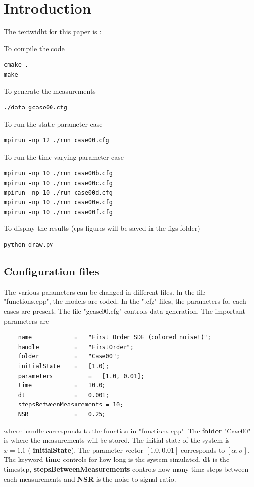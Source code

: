 \documentclass[]{elsarticle}
\begin{document}
\linenumbers

\section*{Introduction}
The textwidht for this paper is : \the\textwidth


To compile the code
\begin{verbatim}
cmake .
make
\end{verbatim}

To generate the measurements
\begin{verbatim}
./data gcase00.cfg
\end{verbatim}

To run the static parameter case
\begin{verbatim}
mpirun -np 12 ./run case00.cfg
\end{verbatim}


To run the time-varying parameter case
\begin{verbatim}
mpirun -np 10 ./run case00b.cfg
mpirun -np 10 ./run case00c.cfg
mpirun -np 10 ./run case00d.cfg
mpirun -np 10 ./run case00e.cfg
mpirun -np 10 ./run case00f.cfg
\end{verbatim}
To display the results (eps figures will be saved in the figs folder)
\begin{verbatim}
python draw.py
\end{verbatim}

\subsection*{Configuration files}
The various parameters can be changed in different files.
In the file "functions.cpp", the models are coded. In the ".cfg" files, the parameters for each cases are present. The file "gcase00.cfg" controls data generation. The important parameters are
\begin{verbatim}
	name 			= 	"First Order SDE (colored noise!)";
	handle 			=	"FirstOrder";
	folder			=	"Case00";
	initialState 	=	[1.0];
	parameters			=	[1.0, 0.01];
	time			=	10.0;
	dt				=	0.001;
	stepsBetweenMeasurements = 10;
	NSR				=	0.25;
\end{verbatim}
where handle corresponds to the function in "functions.cpp". The {\bf folder} "Case00" is where the measurements will be stored. The initial state of the system is $x = 1.0$ ( {\bf initialState}). The parameter vector $[1.0, 0.01]$ corresponds to $[\alpha, \sigma]$. The keyword {\bf time} controls for how long is the system simulated, {\bf dt} is the timestep, {\bf stepsBetweenMeasurements} controls how many time steps between each measurements and {\bf NSR} is the noise to signal ratio.
\end{document}

